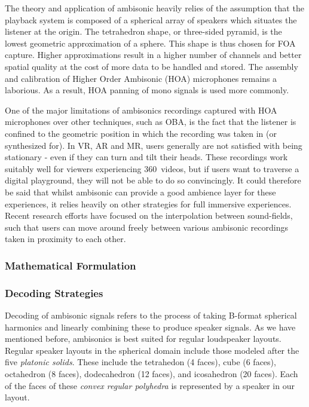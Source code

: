 The theory and application of ambisonic heavily relies of the assumption that the playback system is composed of a spherical array of speakers which situates the listener at the origin. The tetrahedron shape, or three-sided pyramid, is the lowest geometric approximation of a sphere. This shape is thus chosen for FOA capture. Higher approximations result in a higher number of channels and better spatial quality at the cost of more data to be handled and stored. The assembly and calibration of Higher Order Ambisonic (HOA) microphones remains a laborious. As a result, HOA panning of mono signals is used more commonly.

One of the major limitations of ambisonics recordings captured with HOA microphones over other techniques, such as OBA, is the fact that the listener is confined to the geometric position in which the recording was taken in (or synthesized for). In VR, AR and MR, users generally are not satisfied with being stationary - even if they can turn and tilt their heads. These recordings work suitably well for viewers experiencing 360\textdegree \ videos, but if users want to traverse a digital playground, they will not be able to do so convincingly. It could therefore be said that whilst ambisonic can provide a good ambience layer for these experiences, it relies heavily on other strategies for full immersive experiences. Recent research efforts have focused on the interpolation between sound-fields, such that users can move around freely between various ambisonic recordings taken in proximity to each other. 


\subsubsection{Mathematical Formulation}

\subsubsection{Decoding Strategies}

Decoding of ambisonic signals refers to the process of taking B-format spherical harmonics and linearly combining these to produce speaker signals. As we have mentioned before, ambisonics is best suited for regular loudspeaker layouts. Regular speaker layouts in the spherical domain include those modeled after the five \textit{platonic solids}. These include the tetrahedon (4 faces), cube (6 faces), octahedron (8 faces), dodecahedron (12 faces), and icosahedron (20 faces). Each of the faces of these \textit{convex regular polyhedra} is represented by a speaker in our layout. 

